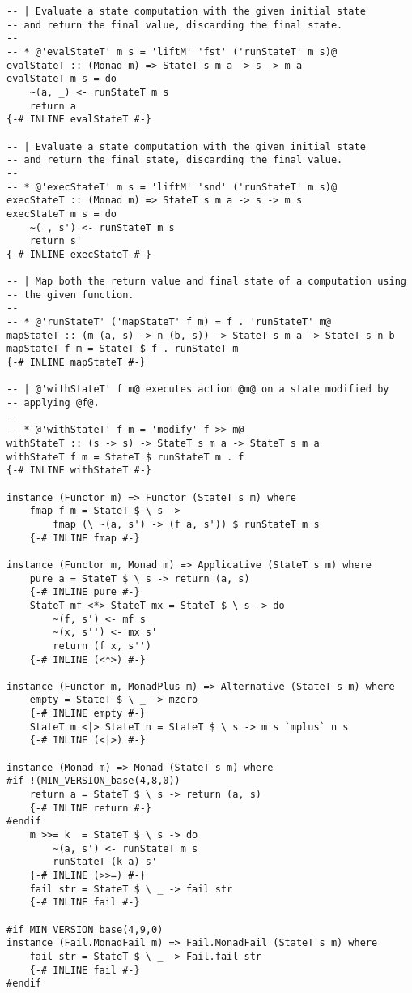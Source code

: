 \begin{multicols}{2}
\begin{lstlisting}
-- | Evaluate a state computation with the given initial state
-- and return the final value, discarding the final state.
--
-- * @'evalStateT' m s = 'liftM' 'fst' ('runStateT' m s)@
evalStateT :: (Monad m) => StateT s m a -> s -> m a
evalStateT m s = do
    ~(a, _) <- runStateT m s
    return a
{-# INLINE evalStateT #-}

-- | Evaluate a state computation with the given initial state
-- and return the final state, discarding the final value.
--
-- * @'execStateT' m s = 'liftM' 'snd' ('runStateT' m s)@
execStateT :: (Monad m) => StateT s m a -> s -> m s
execStateT m s = do
    ~(_, s') <- runStateT m s
    return s'
{-# INLINE execStateT #-}

-- | Map both the return value and final state of a computation using
-- the given function.
--
-- * @'runStateT' ('mapStateT' f m) = f . 'runStateT' m@
mapStateT :: (m (a, s) -> n (b, s)) -> StateT s m a -> StateT s n b
mapStateT f m = StateT $ f . runStateT m
{-# INLINE mapStateT #-}

-- | @'withStateT' f m@ executes action @m@ on a state modified by
-- applying @f@.
--
-- * @'withStateT' f m = 'modify' f >> m@
withStateT :: (s -> s) -> StateT s m a -> StateT s m a
withStateT f m = StateT $ runStateT m . f
{-# INLINE withStateT #-}

instance (Functor m) => Functor (StateT s m) where
    fmap f m = StateT $ \ s ->
        fmap (\ ~(a, s') -> (f a, s')) $ runStateT m s
    {-# INLINE fmap #-}

instance (Functor m, Monad m) => Applicative (StateT s m) where
    pure a = StateT $ \ s -> return (a, s)
    {-# INLINE pure #-}
    StateT mf <*> StateT mx = StateT $ \ s -> do
        ~(f, s') <- mf s
        ~(x, s'') <- mx s'
        return (f x, s'')
    {-# INLINE (<*>) #-}

instance (Functor m, MonadPlus m) => Alternative (StateT s m) where
    empty = StateT $ \ _ -> mzero
    {-# INLINE empty #-}
    StateT m <|> StateT n = StateT $ \ s -> m s `mplus` n s
    {-# INLINE (<|>) #-}

instance (Monad m) => Monad (StateT s m) where
#if !(MIN_VERSION_base(4,8,0))
    return a = StateT $ \ s -> return (a, s)
    {-# INLINE return #-}
#endif
    m >>= k  = StateT $ \ s -> do
        ~(a, s') <- runStateT m s
        runStateT (k a) s'
    {-# INLINE (>>=) #-}
    fail str = StateT $ \ _ -> fail str
    {-# INLINE fail #-}

#if MIN_VERSION_base(4,9,0)
instance (Fail.MonadFail m) => Fail.MonadFail (StateT s m) where
    fail str = StateT $ \ _ -> Fail.fail str
    {-# INLINE fail #-}
#endif


\end{lstlisting}
\end{multicols}
